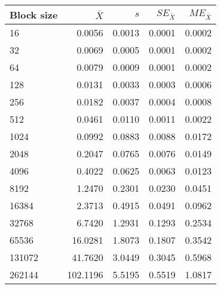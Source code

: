 \begin{tabular}{lrrrr}\toprule
{\small Block size} & $\bar{X}$ & $s$ & $SE_{\bar{X}}$ & $ME_{\bar{X}}$ \\\midrule
16 & 0.0056 & 0.0013 & 0.0001 & 0.0002\\
32 & 0.0069 & 0.0005 & 0.0001 & 0.0002\\
64 & 0.0079 & 0.0009 & 0.0001 & 0.0002\\
128 & 0.0131 & 0.0033 & 0.0003 & 0.0006\\
256 & 0.0182 & 0.0037 & 0.0004 & 0.0008\\
512 & 0.0461 & 0.0110 & 0.0011 & 0.0022\\
1024 & 0.0992 & 0.0883 & 0.0088 & 0.0172\\
2048 & 0.2047 & 0.0765 & 0.0076 & 0.0149\\
4096 & 0.4022 & 0.0625 & 0.0063 & 0.0123\\
8192 & 1.2470 & 0.2301 & 0.0230 & 0.0451\\
16384 & 2.3713 & 0.4915 & 0.0491 & 0.0962\\
32768 & 6.7420 & 1.2931 & 0.1293 & 0.2534\\
65536 & 16.0281 & 1.8073 & 0.1807 & 0.3542\\
131072 & 41.7620 & 3.0449 & 0.3045 & 0.5968\\
262144 & 102.1196 & 5.5195 & 0.5519 & 1.0817\\
\bottomrule
\end{tabular}
